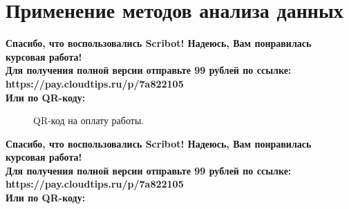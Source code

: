 \documentclass{article}
\begin{document}
\section{Применение методов анализа данных}
\begin{center}
    \textbf{
        Спасибо, что воспользовались Scribot! Надеюсь, Вам понравилась курсовая работа!\\
        Для получения полной версии отправьте 99 рублей по ссылке:\\
        https://pay.cloudtips.ru/p/7a822105\\
        Или по QR-коду:\\
    }
\end{center}
\begin{figure}[h]
    \caption{QR-код на оплату работы.}
    \label{ris:image}
\end{figure}
\newpage
\begin{center}
    \textbf{
        Спасибо, что воспользовались Scribot! Надеюсь, Вам понравилась курсовая работа!\\
        Для получения полной версии отправьте 99 рублей по ссылке:\\
        https://pay.cloudtips.ru/p/7a822105\\
        Или по QR-коду:\\
    }
\end{center}
\end{document}
